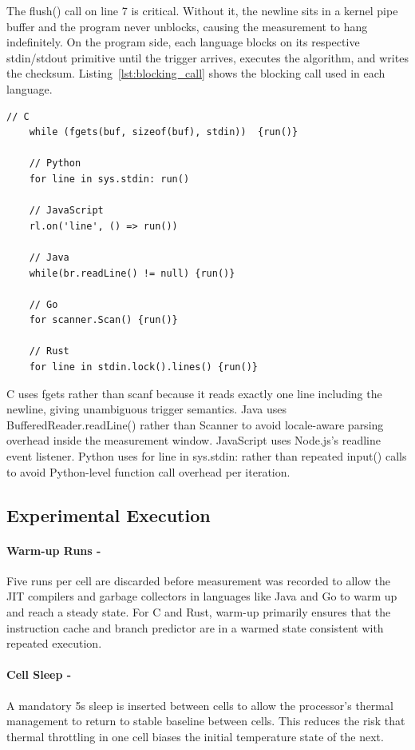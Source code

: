 The flush() call on line 7 is critical. Without it, the newline sits in a kernel pipe buffer and the program never unblocks, causing the measurement to hang indefinitely. On the program side, each language blocks on its respective stdin/stdout primitive until the trigger arrives, executes the algorithm, and writes the checksum. Listing~\ref{lst:blocking_call} shows the blocking call used in each language.
\begin{lstlisting}[caption={Stdin primitives in each language implementation}, label={lst:blocking_call}, numbers=none]
    // C
    while (fgets(buf, sizeof(buf), stdin))  {run()}

    // Python
    for line in sys.stdin: run()

    // JavaScript 
    rl.on('line', () => run())

    // Java
    while(br.readLine() != null) {run()}

    // Go 
    for scanner.Scan() {run()}

    // Rust 
    for line in stdin.lock().lines() {run()}

\end{lstlisting}


C uses fgets rather than scanf because it reads exactly one line including the newline, giving unambiguous trigger semantics. Java uses BufferedReader.readLine() rather than Scanner to avoid locale-aware parsing overhead inside the measurement window. JavaScript uses Node.js's readline event listener. Python uses for line in sys.stdin: rather than repeated input() calls to avoid Python-level function call overhead per iteration.






\subsection{Experimental Execution}

\paragraph{Warm-up Runs -} Five runs per cell are discarded before measurement was recorded to allow the JIT compilers and garbage collectors in languages like Java and Go to warm up and reach a steady state. For C and Rust, warm-up primarily ensures that the instruction cache and branch predictor are in a warmed state consistent with repeated execution. 

\paragraph{Cell Sleep -} A mandatory 5s sleep is inserted between cells to allow the processor's thermal management to return to stable baseline between cells. This reduces the risk that thermal throttling in one cell biases the initial temperature state of the next.


